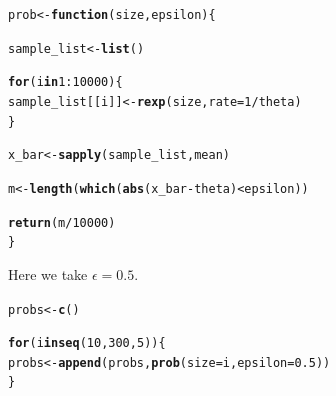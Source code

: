 \documentclass[11pt, a4paper]{article}\usepackage[]{graphicx}\usepackage[]{xcolor}
\makeatletter
\newcommand{\hlnum}[1]{\textcolor[rgb]{0.686,0.059,0.569}{#1}}%
\newcommand{\hlopt}[1]{\textcolor[rgb]{0,0,0}{#1}}%
\newcommand{\hldef}[1]{\textcolor[rgb]{0.345,0.345,0.345}{#1}}%
\newcommand{\hlkwa}[1]{\textcolor[rgb]{0.161,0.373,0.58}{\textbf{#1}}}%
\newcommand{\hlkwb}[1]{\textcolor[rgb]{0.69,0.353,0.396}{#1}}%
\newcommand{\hlkwc}[1]{\textcolor[rgb]{0.333,0.667,0.333}{#1}}%
\newcommand{\hlkwd}[1]{\textcolor[rgb]{0.737,0.353,0.396}{\textbf{#1}}}%
\newenvironment{kframe}{%
 \def\at@end@of@kframe{}%
 \ifinner\ifhmode%
  \def\at@end@of@kframe{\end{minipage}}%
  \begin{minipage}{\columnwidth}%
 \fi\fi%
 \def\FrameCommand##1{\hskip\@totalleftmargin \hskip-\fboxsep
 \colorbox{shadecolor}{##1}\hskip-\fboxsep
     \hskip-\linewidth \hskip-\@totalleftmargin \hskip\columnwidth}%
 \MakeFramed {\advance\hsize-\width
   \@totalleftmargin\z@ \linewidth\hsize
   \@setminipage}}%
 {\par\unskip\endMakeFramed%
 \at@end@of@kframe}
\newenvironment{knitrout}{}{} %
\makeatother
\begin{document}
\begin{knitrout}
\color{fgcolor}\begin{kframe}
\begin{alltt}
\hldef{prob} \hlkwb{<-} \hlkwa{function}\hldef{(}\hlkwc{size}\hldef{,} \hlkwc{epsilon}\hldef{)\{}

  \hldef{sample_list} \hlkwb{<-} \hlkwd{list}\hldef{()}

  \hlkwa{for}\hldef{(i} \hlkwa{in} \hlnum{1}\hlopt{:}\hlnum{10000}\hldef{)\{}
    \hldef{sample_list[[i]]} \hlkwb{<-} \hlkwd{rexp}\hldef{(size,} \hlkwc{rate} \hldef{=} \hlnum{1} \hlopt{/} \hldef{theta)}
  \hldef{\}}

  \hldef{x_bar} \hlkwb{<-} \hlkwd{sapply}\hldef{(sample_list, mean)}

  \hldef{m} \hlkwb{<-} \hlkwd{length}\hldef{(}\hlkwd{which}\hldef{(}\hlkwd{abs}\hldef{(x_bar} \hlopt{-} \hldef{theta)} \hlopt{<} \hldef{epsilon))}

  \hlkwd{return}\hldef{(m}\hlopt{/}\hlnum{10000}\hldef{)}
\hldef{\}}
\end{alltt}
\end{kframe}
\end{knitrout}

Here we take $\epsilon = 0.5$.

\begin{knitrout}
\color{fgcolor}\begin{kframe}
\begin{alltt}
\hldef{probs} \hlkwb{<-} \hlkwd{c}\hldef{()}

\hlkwa{for} \hldef{(i} \hlkwa{in} \hlkwd{seq}\hldef{(}\hlnum{10}\hldef{,} \hlnum{300}\hldef{,} \hlnum{5}\hldef{)) \{}
  \hldef{probs} \hlkwb{<-} \hlkwd{append}\hldef{(probs,} \hlkwd{prob}\hldef{(}\hlkwc{size} \hldef{= i,} \hlkwc{epsilon} \hldef{=} \hlnum{0.5}\hldef{))}
\hldef{\}}
\end{alltt}
\end{kframe}
\end{knitrout}
\end{document}
